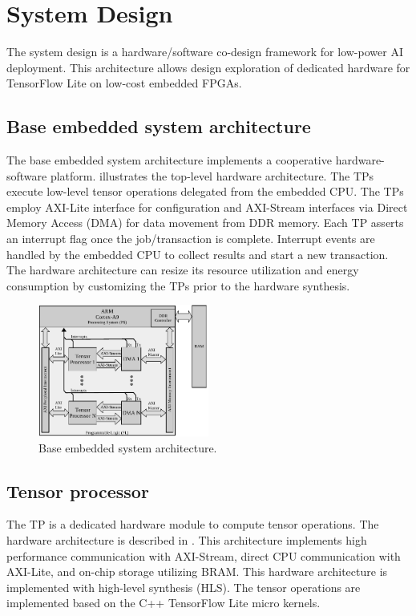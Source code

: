 \section{System Design}
\label{sec:system_design}
The system design is a hardware/software co-design framework for low-power AI deployment. This architecture allows design exploration of dedicated hardware for TensorFlow Lite on low-cost embedded FPGAs.

\subsection{Base embedded system architecture}
The base embedded system architecture implements a cooperative hardware-software platform.  illustrates the top-level hardware architecture. The TPs execute low-level tensor operations delegated from the embedded CPU. The TPs employ AXI-Lite interface for configuration and AXI-Stream interfaces via Direct Memory Access (DMA) for data movement from DDR memory. Each TP asserts an interrupt flag once the job/transaction is complete. Interrupt events are handled by the embedded CPU to collect results and start a new transaction. The hardware architecture can resize its resource utilization and energy consumption by customizing the TPs prior to the hardware synthesis.
\begin{figure}[t!]
	\centering
	\includegraphics[width=0.5\textwidth]{../figures/system_design.pdf}
	\caption{Base embedded system architecture.}
	\label{fig:system_architecture}
\end{figure}
\subsection{Tensor processor}
The TP is a dedicated hardware module to compute tensor operations. The hardware architecture is described in . This architecture implements high performance communication with AXI-Stream, direct CPU communication with AXI-Lite, and on-chip storage utilizing BRAM. This hardware architecture is implemented with high-level synthesis (HLS). The tensor operations are implemented based on the C++ TensorFlow Lite micro kernels.


